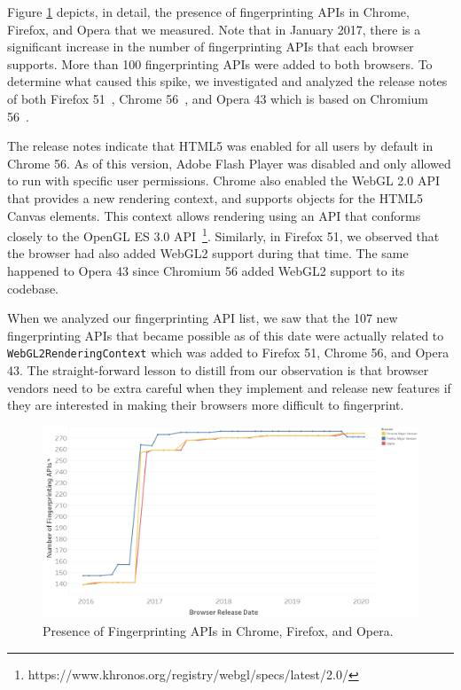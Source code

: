 Figure \ref{fig:fingerprint-apis} depicts, in detail, the presence of
fingerprinting APIs in Chrome, Firefox, and Opera that we measured. Note that
in January 2017, there is a significant increase in the number of
fingerprinting APIs that each browser supports. More than 100
fingerprinting APIs were added to both browsers. To determine what
caused this spike, we investigated and analyzed the release notes of
both Firefox 51~\cite{firefox-51-notes}, Chrome
56~\cite{chrome-56-notes}, and Opera 43 which is based on Chromium 56~\cite{opera-43-notes}.

The release notes indicate that HTML5 was enabled for all users by
default in Chrome 56. As of this version, Adobe Flash Player was
disabled and only allowed to run with specific user permissions.
Chrome also enabled the WebGL 2.0 API that provides a new rendering
context, and supports objects for the HTML5 Canvas elements. This
context allows rendering using an API that conforms closely to the
OpenGL ES 3.0
API~\footnote{https://www.khronos.org/registry/webgl/specs/latest/2.0/}.
Similarly, in Firefox 51, we observed that the browser had also added
WebGL2 support during that time. The same happened to Opera 43 since Chromium 56
added WebGL2 support to its codebase.

When we analyzed our fingerprinting API list, we saw that the 107 new
fingerprinting APIs that became possible as of this date were actually
related to \texttt{WebGL2RenderingContext} which was added to Firefox
51, Chrome 56, and Opera 43. The straight-forward lesson to distill from our
observation is that browser vendors need to be extra careful when they
implement and release new features if they are interested in making
their browsers more difficult to fingerprint.

\begin{figure}[ht]
    \centering
    \includegraphics[width=\columnwidth]{figures/Fingerprinting-APIs.png}
    \caption{Presence of Fingerprinting APIs in Chrome, Firefox, and Opera.}
    \label{fig:fingerprint-apis}
\end{figure}

